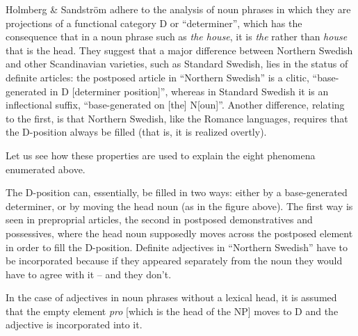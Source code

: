\begin{styleBodytextC}
Holmberg \& Sandström adhere to the analysis of noun phrases in which they are projections of a functional category D or “determiner”, which has the consequence that in a noun phrase such as \textit{the house}, it is \textit{the} rather than \textit{house} that is the head. They suggest that a major difference between Northern Swedish and other Scandinavian varieties, such as Standard Swedish, lies in the status of definite articles: the postposed article in “Northern Swedish” is a clitic, “base-generated in D [determiner position]”, whereas in Standard Swedish it is an inflectional suffix, “base-generated on [the] N[oun]”. Another difference, relating to the first, is that Northern Swedish, like the Romance languages, requires that the D-position always be filled (that is, it is realized overtly).

\end{styleBodytextC}

\begin{styleBodytextC}
Let us see how these properties are used to explain the eight phenomena enumerated above. 

\end{styleBodytextC}

\begin{styleBodytextC}
  [Warning: Image ignored] %
 

\end{styleBodytextC}

\begin{styleBodytextC}
The D-position can, essentially, be filled in two ways: either by a base-generated determiner, or by moving the head noun (as in the figure above). The first way is seen in preproprial articles, the second in postposed demonstratives and possessives, where the head noun supposedly moves across the postposed element in order to fill the D-position. Definite adjectives in “Northern Swedish” have to be incorporated because if they appeared separately from the noun they would have to agree with it – and they don’t. 

\end{styleBodytextC}

\begin{styleBodytextC}
In the case of adjectives in noun phrases without a lexical head, it is assumed that the empty element \textit{pro} [which is the head of the NP] moves to D and the adjective is incorporated into it. 

\end{styleBodytextC}

